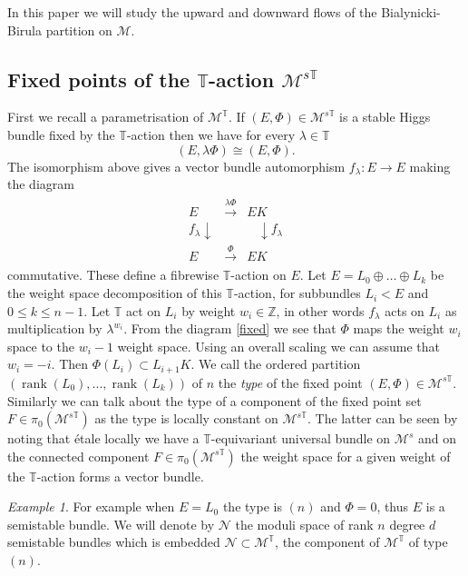 \documentclass[12pt]{article}
\numberwithin{equation}{section}
\theoremstyle{remark}
\newtheorem{example}[theorem]{Example}
\theoremstyle{definition}
\numberwithin{theorem}{section}
\def\beq{\begin{eqnarray}}
\def\eeq{\end{eqnarray}}
\DeclareMathOperator{\rank}{rank}
\def\calN{{\mathcal{N}}}
\def\M{{\mathcal{M}}}
\newcommand{\T}{{\mathbb{T}}}
\def\Z{\mathbb{Z}}
\renewcommand{\1}{\mathbbm{1}}
\begin{document}
In this paper we will study the upward and downward flows of the Bialynicki-Birula partition on $\M$.  

\subsection{Fixed points of the $\T$-action $\M^{s\T}$}
First we recall a parametrisation of $\M^\T$. If $(E,\Phi)\in \M^{s\T}$ is a stable Higgs bundle fixed by the $\T$-action then we have for every $\lambda\in\T$ $$(E,\lambda\Phi)\cong (E,\Phi).$$ The isomorphism above gives a vector bundle automorphism $f_\lambda:E\to E$  making the diagram \beq\label{fixed}\begin{array}{ccc} E&\stackrel{\lambda \Phi}{\longrightarrow} & EK\\ \!\!\!\!\! f_\lambda \downarrow &&\,\,\,\,\,\downarrow f_\lambda \\ E &\stackrel{\Phi}{\longrightarrow}& EK \end{array}\eeq
commutative. These define a fibrewise $\T$-action on $E$. Let $E=L_0\oplus \dots\oplus  L_k$ be the weight space decomposition of this $\T$-action, for subbundles $L_i<E$ and $0\leq k \leq n-1$. Let $\T$ act on $L_i$ by weight $w_i\in \Z$, in other words $f_\lambda$ acts on $L_i$ as multiplication by $\lambda^{w_i}$. %
From the diagram \eqref{fixed} we see that $\Phi$ maps the weight $w_i$ space to the $w_i-1$ weight space. Using an overall scaling we can assume that $w_i=-i$. Then $\Phi(L_i)\subset L_{i+1}K$. 
We call the ordered partition $(\rank(L_0),...,\rank(L_k))$  of $n$ the {\em type} of the fixed point $(E,\Phi)\in \M^{s\T}$.  Similarly we can talk about the type of a component of the fixed point set  $F\in \pi_0(\M^{s\T})$ as the type is locally constant on $\M^{s\T}$. The latter can be seen by noting that \'etale locally we have a $\T$-equivariant universal bundle on $\M^s$ and on the connected component $F\in \pi_0(\M^{s\T})$  the weight space for a given weight of the $\T$-action forms a vector bundle. 

\begin{example} For example when $E=L_0$ the type is $(n)$ and $\Phi=0$, thus $E$ is a semistable bundle. We will denote by $\calN$ the moduli space of rank $n$ degree $d$ semistable bundles which is embedded $\calN\subset \M^\T$, the component of $\M^\T$ of type $(n)$.
\end{example}
\end{document}
